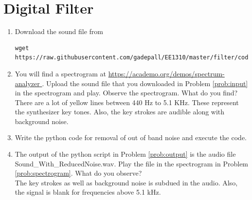 \documentclass[journal,12pt,twocolumn]{IEEEtran}
\renewcommand\thesection{\arabic{section}}
\begin{document}
	\section{Digital Filter}
	\begin{enumerate}[label=\thesection.\arabic*
		,ref=\thesection.\theenumi]
		\item
		\label{prob:input}
		Download the sound file from  
		\begin{lstlisting}
wget https://raw.githubusercontent.com/gadepall/EE1310/master/filter/codes/Sound_Noise.wav
		\end{lstlisting}
		\item
		\label{prob:spectrogram}
		You will find a spectrogram at \href{https://academo.org/demos/spectrum-analyzer}{\url{https://academo.org/demos/spectrum-analyzer} }. 
		Upload the sound file that you downloaded in Problem \ref{prob:input} in the spectrogram  and play.  Observe the spectrogram. What do you find?
		\\
		\solution There are a lot of yellow lines between 440 Hz to 5.1 KHz.  These represent the synthesizer key tones. Also, the key strokes
		are audible along with background noise.
		\item
		\label{prob:output}
		Write the python code for removal of out of band noise and execute the code.
		\\
		\solution
		
		\item
		The output of the python script in Problem \ref{prob:output} is the audio file Sound\_With\_ReducedNoise.wav. Play the file in the spectrogram in Problem \ref{prob:spectrogram}. What do you observe?
		\\
		\solution The key strokes as well as background noise is subdued in the audio.  Also,  the signal is blank for frequencies above 5.1 kHz.
		
	\end{enumerate}
\end{document}
